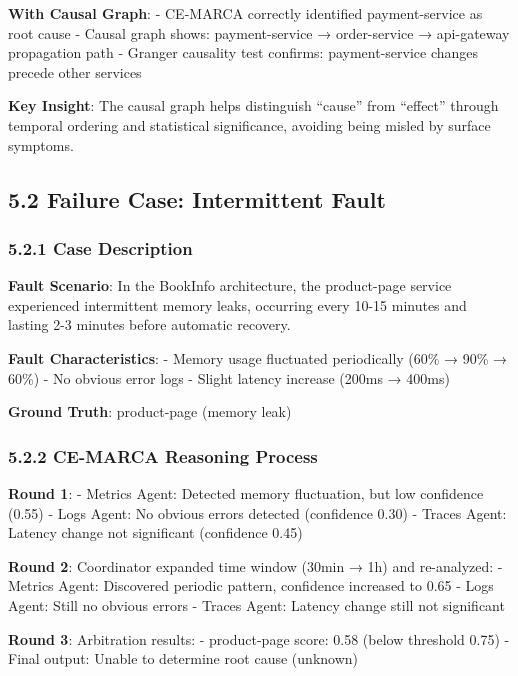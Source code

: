 \textbf{With Causal Graph}: - CE-MARCA correctly identified
payment-service as root cause - Causal graph shows: payment-service →
order-service → api-gateway propagation path - Granger causality test
confirms: payment-service changes precede other services

\textbf{Key Insight}: The causal graph helps distinguish ``cause'' from
``effect'' through temporal ordering and statistical significance,
avoiding being misled by surface symptoms.

\hypertarget{failure-case-intermittent-fault}{%
\subsection{5.2 Failure Case: Intermittent
Fault}\label{failure-case-intermittent-fault}}

\hypertarget{case-description-1}{%
\subsubsection{5.2.1 Case Description}\label{case-description-1}}

\textbf{Fault Scenario}: In the BookInfo architecture, the product-page
service experienced intermittent memory leaks, occurring every 10-15
minutes and lasting 2-3 minutes before automatic recovery.

\textbf{Fault Characteristics}: - Memory usage fluctuated periodically
(60\% → 90\% → 60\%) - No obvious error logs - Slight latency increase
(200ms → 400ms)

\textbf{Ground Truth}: product-page (memory leak)

\hypertarget{ce-marca-reasoning-process-1}{%
\subsubsection{5.2.2 CE-MARCA Reasoning
Process}\label{ce-marca-reasoning-process-1}}

\textbf{Round 1}: - Metrics Agent: Detected memory fluctuation, but low
confidence (0.55) - Logs Agent: No obvious errors detected (confidence
0.30) - Traces Agent: Latency change not significant (confidence 0.45)

\textbf{Round 2}: Coordinator expanded time window (30min → 1h) and
re-analyzed: - Metrics Agent: Discovered periodic pattern, confidence
increased to 0.65 - Logs Agent: Still no obvious errors - Traces Agent:
Latency change still not significant

\textbf{Round 3}: Arbitration results: - product-page score: 0.58 (below
threshold 0.75) - Final output: Unable to determine root cause (unknown)

